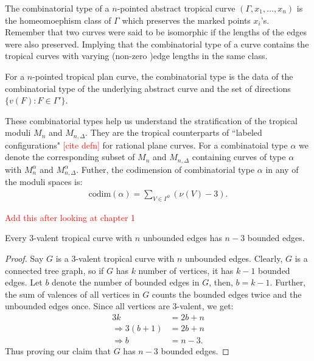 \begin{definition}
    The combinatorial type of a $n$-pointed abstract tropical curve $(\Gamma, x_{1},\dots, x_{n})$ is the homeomoephism class of $\Gamma$ which preserves the marked points $x_{i}$'s.
    Remember that two curves were said to be isomorphic if the lengths of the edges were also preserved.
    Implying that the combinatorial type of a curve contains the tropical curves with varying (non-zero )edge lengths in the same class.
    \par For a $n$-pointed tropical plan curve, the combinatorial type is the data of the combinatorial type of the underlying abstract curve and the set of directions $\{v(F): F \in \Gamma'\}$.
\end{definition}

These combinatorial types help us understand the stratification of the tropical moduli $M_{n}$ and $M_{n,\Delta}$. 
They are the tropical counterparts of ``labeled configurations" \textcolor{red}{[cite defn]} for rational plane curves.
For a combinatoial type $\alpha$ we denote the corresponding subset of $M_{n}$ and $M_{n,\Delta}$ containing curves of type $\alpha$ with $M^{\alpha}_{n}$ and $M^{\alpha}_{n,\Delta}$. 
Futher, the codimension of combinatorial type $\alpha$ in any of the moduli spaces is:
\begin{align*}
    \text{codim}(\alpha) = \sum_{V \in \Gamma^{0}} (\nu(V)-3).
\end{align*}

\begin{lemma}
    \textcolor{red}{Add this after looking at chapter 1}
\end{lemma}

\begin{lemma}
    Every $3$-valent tropical curve with $n$ unbounded edges has $n-3$ bounded edges.
\end{lemma}
\begin{proof}
    Say $G$ is a $3$-valent tropical curve with $n$ unbounded edges. 
    Clearly, $G$ is a connected tree graph, so if $G$ has $k$ number of vertices, it has $k-1$ bounded edges. 
    Let $b$ denote the number of bounded edges in $G$, then, $b = k-1$. 
    Further, the sum of valences of all vertices in $G$ counts the bounded edges twice and the unbounded edges once.
    Since all vertices are $3$-valent, we get:
    \begin{align*}
        3k &= 2b + n \\
        \Rightarrow 3(b+1) &= 2b + n\\
        \Rightarrow b &= n-3.
    \end{align*}
    Thus proving our claim that $G$ has $n-3$ bounded edges.
\end{proof}

